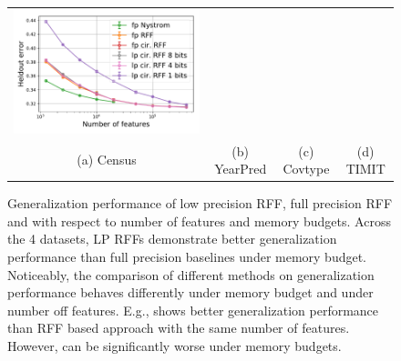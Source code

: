 \begin{figure}
\begin{tabular}{c@{\hskip 0in}c@{\hskip 0in}c@{\hskip 0in}c}
		\includegraphics[width=0.3\linewidth]{figures/timit_error_vs_n_feat.pdf} \\
		(a) Census & (b) YearPred & (c) Covtype & (d) TIMIT \\
	\end{tabular}
	\caption{Generalization performance of low precision RFF, full precision RFF and \Nystrom with respect to number of features and memory budgets. Across the 4 datasets, LP RFFs demonstrate better generalization performance than full precision baselines under memory budget. Noticeably, the comparison of different methods on generalization performance behaves differently under memory budget and under number off features. E.g., \Nystrom shows better generalization performance than RFF based approach with the same number of features. However, \Nystrom can be significantly worse under memory budgets.}
	\label{fig:generalization_col}
\end{figure}


